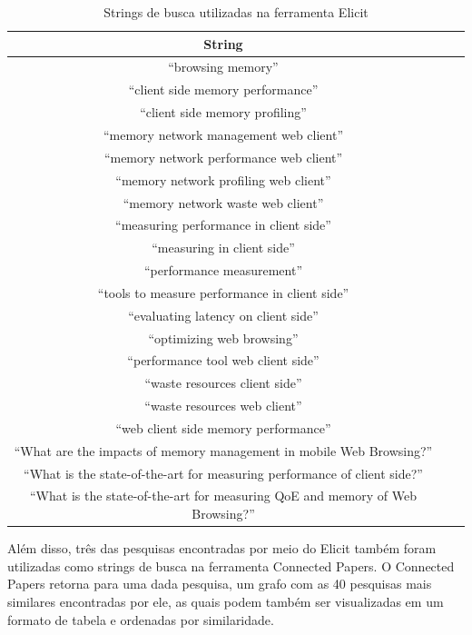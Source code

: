 \documentclass[12pt]{tcc}
\begin{document}
\begin{table}[!ht]
	\centering
	\caption{Strings de busca utilizadas na ferramenta Elicit}
	\begin{tabular}{c L{1.5cm} R{1.5cm}}
		\toprule
		\textbf{String} \\
		\midrule
		``browsing memory'' \\
		``client side memory performance'' \\
		``client side memory profiling'' \\
		``memory network management web client'' \\
		``memory network performance web client'' \\
		``memory network profiling web client'' \\
		``memory network waste web client'' \\
		``measuring performance in client side'' \\
		``measuring in client side'' \\
		``performance measurement'' \\
		``tools to measure performance in client side'' \\
		``evaluating latency on client side'' \\
		``optimizing web browsing'' \\
		``performance tool web client side'' \\
		``waste resources client side'' \\
		``waste resources web client'' \\
		``web client side memory performance'' \\
		``What are the impacts of memory management in mobile Web Browsing?'' \\
		``What is the state-of-the-art for measuring performance of client side?'' \\
		``What is the state-of-the-art for measuring QoE and memory of Web Browsing?'' \\
		\bottomrule
	\end{tabular}
	\label{tab:string-busca-elicit}
\end{table}

Além disso, três das pesquisas encontradas por meio do Elicit também foram utilizadas como strings de busca na ferramenta Connected Papers.
O Connected Papers retorna para uma dada pesquisa, um grafo com as 40 pesquisas mais similares encontradas por ele, as quais podem também ser visualizadas em um formato de tabela e ordenadas por similaridade.
\end{document}
